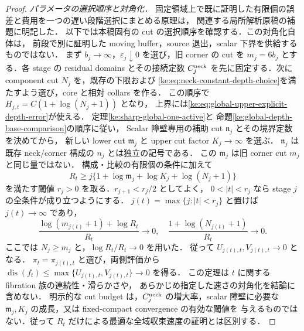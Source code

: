\begin{proof}
\emph{パラメータの選択順序と対角化．}
固定領域上で既に証明した有限個の誤差と費用を一つの遅い段階選択にまとめる原理は，
関連する局所解析原稿の補題\cite[\texttt{pair:lem:diagonal-fixed-end}]{KELocalCurrent}に明記した．
以下では本稿固有の cut の選択順序を確認する．この対角化自体は，
前段で別に証明した moving buffer，source 退出，scalar 下界を供給するものではない．
まず $b_j\to\infty$，$\varepsilon_j\downarrow0$ を選び，旧 corner の cut を
$m_j=6b_j$ とする．各 stage の residual domains とその接続定数
$C_j^{\rm neck}$ を先に固定する．次に component cut $N_j$ を，既存の下限および
\eqref{ke:eq:neck-constant-depth-choice}を満たすよう選び，core と相対 collars を作る．
この順序で $H_{j,t}=C(1+\log(N_j+1))$ となり，
上界には\eqref{ke:eq:global-upper-explicit-depth-error}が使える．
定理\ref{ke:sharp-global-one-active}と
命題\ref{ke:global-depth-base-comparison}の順序に従い，
Scalar 障壁専用の補助 cut $\mathfrak n_j$ とその境界定数を決めてから，
新しい lower cut $\mathfrak m_j$ と upper cut factor $K_j\to\infty$ を選ぶ．
$\mathfrak n_j$ は既存 neck/corner 構成の $n_j$ とは独立の記号である．
この $\mathfrak m_j$ は旧 corner cut $m_j$ と同じ量ではない．
構成・比較の有限個の条件に加えて
\begin{equation}\label{ke:eq:global-realization-diagonal}
 R_t\ge j\{1+\log\mathfrak m_j+\log K_j+\log(N_j+1)\}
\end{equation}
を満たす閾値 $r_j>0$ を取る．$r_{j+1}<r_j/2$ としてよく，
$0<|t|<r_j$ なら stage $j$ の全条件が成り立つようにする．
$j(t)=\max\{j:|t|<r_j\}$ と置けば $j(t)\to\infty$ であり，
\[
 \frac{\log(m_{j(t)}+1)+\log R_t}{R_t}\to0,
 \quad \frac{1+\log(N_{j(t)}+1)}{R_t}\to0.
\]
ここでは $N_j\ge m_j$ と，$\log R_t/R_t\to0$ を用いた．
従って $U_{j(t),t},V_{j(t),t}\to0$ となる．
$\pi_t=\pi_{j(t),t}$ と選び，両側評価から
$\operatorname{dis}(f_t)\le\max\{U_{j(t),t},V_{j(t),t}\}\to0$ を得る．
この定理は $t$ に関する fibration 族の連続性・滑らかさや，
あらかじめ指定した速さの対角化を結論に含めない．
明示的な cut budget は，$C_j^{\rm neck}$ の増大率，scalar 障壁に必要な
$\mathfrak m_j,K_j$ の成長，又は fixed-compact convergence の有効な閾値を
与えるものではない．従って $R_t$ だけによる最適な全域収束速度の証明とは区別する．
\end{proof}

